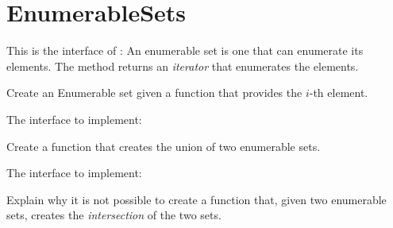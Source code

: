 \section{EnumerableSets}

This is the interface of :
%
%
An enumerable set is one that can enumerate its elements.
The method  returns an \emph{iterator} that enumerates the elements.

\begin{exercise}
  Create an Enumerable set given a function that provides the $i$-th element.

  The interface to implement:
%
\end{exercise}

\begin{exercise}
  Create a function that creates the union of two enumerable sets.

  The interface to implement:
%
\end{exercise}

\begin{exercise}
  Explain why it is not possible to create a function that, given two enumerable sets,
  creates the \emph{intersection} of the two sets.
\end{exercise}


